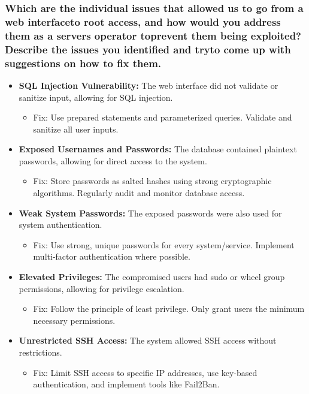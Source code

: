 \subsubsection{Which are the individual issues that allowed us to go from a web interfaceto root access, and how would you address them as a servers operator toprevent them being exploited? Describe the issues you identified and tryto come up with suggestions on how to fix them.}
\begin{itemize}
      \item \textbf{SQL Injection Vulnerability:}
            The web interface did not validate or sanitize input, allowing for SQL injection.
            \begin{itemize}
                  \item Fix: Use prepared statements and parameterized queries. Validate and sanitize all user inputs.
            \end{itemize}

      \item \textbf{Exposed Usernames and Passwords:}
            The database contained plaintext passwords, allowing for direct access to the system.
            \begin{itemize}
                  \item Fix: Store passwords as salted hashes using strong cryptographic algorithms. Regularly audit and monitor database access.
            \end{itemize}

      \item \textbf{Weak System Passwords:}
            The exposed passwords were also used for system authentication.
            \begin{itemize}
                  \item Fix: Use strong, unique passwords for every system/service. Implement multi-factor authentication where possible.
            \end{itemize}

      \item \textbf{Elevated Privileges:}
            The compromised users had sudo or wheel group permissions, allowing for privilege escalation.
            \begin{itemize}
                  \item Fix: Follow the principle of least privilege. Only grant users the minimum necessary permissions.
            \end{itemize}

      \item \textbf{Unrestricted SSH Access:}
            The system allowed SSH access without restrictions.
            \begin{itemize}
                  \item Fix: Limit SSH access to specific IP addresses, use key-based authentication, and implement tools like Fail2Ban.
            \end{itemize}
\end{itemize}




